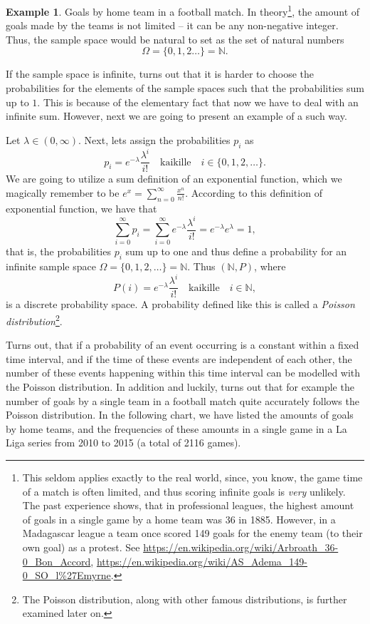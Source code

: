 \documentclass[12pt,a4paper,leqno]{report}
\newcommand{\N}{\mathbb{N}}
\theoremstyle{plain}
\theoremstyle{definition}
\newtheorem{esim}[equation]{Example}
\begin{document}
\begin{esim}
\label{esim:laliga}
Goals by home team in a football match. In theory\footnote{This seldom applies exactly to the real world, since, you know, the game time of a match is often limited, and thus scoring infinite goals is \emph{very} unlikely. The past experience shows, that in professional leagues, the highest amount of goals in a single game by a home team was 36 in 1885. However, in a Madagascar league a team once scored 149 goals for the enemy team (to their own goal) as a protest. See \url{https://en.wikipedia.org/wiki/Arbroath_36-0_Bon_Accord}, \url{https://en.wikipedia.org/wiki/AS_Adema_149-0_SO_l\%27Emyrne}.}, the amount of goals made by the teams is not limited -- it can be any non-negative integer. Thus, the sample space would be natural to set as the set of natural numbers
\[
\Omega = \{0,1,2 \dots\} = \N.
\]

\bigskip

If the sample space is infinite, turns out that it is harder to choose the probabilities for the elements of the sample spaces such that the probabilities sum up to $1.$ This is because of the elementary fact that now we have to deal with an infinite sum. However, next we are going to present an example of a such way.

\bigskip 

Let $\lambda \in (0, \infty)$. Next, lets assign the probabilities $p_i$ as 
\[
p_i = e^{-\lambda} \frac{\lambda^i}{i!} \quad \text{kaikille} \quad i \in \{0,1,2, \dots\}.
\]
We are going to utilize a sum definition of an exponential function, which we magically remember to be $e^x = \sum_{n=0}^\infty \frac{x^n}{n!}$. According to this definition of exponential function, we have that 
\[
\sum_{i=0}^\infty p_i = \sum_{i=0}^\infty e^{-\lambda} \frac{\lambda^i}{i!} = e^{-\lambda} e^\lambda = 1, 
\] 
that is, the probabilities $p_i$ sum up to one and thus define a probability for an infinite sample space $\Omega = \{0,1,2, \dots\} = \N$. Thus $(\N,P)$, where
\[
P(i) =  e^{-\lambda} \frac{\lambda^i}{i!} \quad \text{kaikille} \quad i \in \N,
\]
is a discrete probability space. A probability defined like this is called a \emph{Poisson distribution}\footnote{The Poisson distribution, along with other famous distributions, is further examined later on.}.

Turns out, that if a probability of an event occurring is a constant within a fixed time interval, and if the time of these events are independent of each other, the number of these events happening within this time interval can be modelled with the Poisson distribution. In addition and luckily, turns out that for example the number of goals by a single team in a football match quite accurately follows the Poisson distribution. In the following chart, we have listed the amounts of goals by home teams, and the frequencies of these amounts in a single game in a La Liga series from 2010 to 2015 (a total of 2116 games).


\end{esim}
\end{document}
